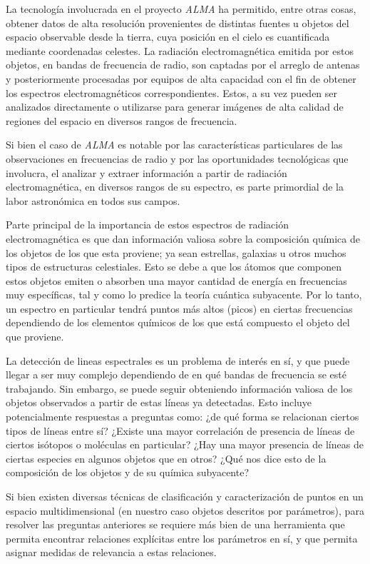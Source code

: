 \begin{intro}
La tecnología involucrada en el proyecto \textit{ALMA} ha permitido, entre otras cosas, obtener datos de alta resolución provenientes de distintas fuentes u objetos del espacio observable desde la tierra, cuya posición en el cielo es cuantificada mediante coordenadas celestes. La radiación electromagnética emitida por estos objetos, en bandas de frecuencia de radio, son captadas por el arreglo de antenas y posteriormente procesadas por equipos de alta capacidad con el fin de obtener los espectros electromagnéticos correspondientes. Estos, a su vez pueden ser analizados directamente o utilizarse para generar imágenes de alta calidad de regiones del espacio en diversos rangos de frecuencia.

Si bien el caso de \textit{ALMA} es notable por las características particulares de las observaciones en frecuencias de radio y por las oportunidades tecnológicas que involucra, el analizar y extraer información a partir de radiación electromagnética, en diversos rangos de su espectro, es parte primordial de la labor astronómica en todos sus campos.

Parte principal de la importancia de estos espectros de radiación electromagnética es que dan información valiosa sobre la composición química de los objetos de los que esta proviene; ya sean estrellas, galaxias u otros muchos tipos de estructuras celestiales. Esto se debe a que los átomos que componen estos objetos emiten o absorben una mayor cantidad de energía en frecuencias muy específicas, tal y como lo predice la teoría cuántica subyacente. Por lo tanto, un espectro en particular tendrá puntos más altos (picos) en ciertas frecuencias dependiendo de los elementos químicos de los que está compuesto el objeto del que proviene.

La detección de lineas espectrales es un problema de interés en sí, y que puede llegar a ser muy complejo dependiendo de en qué bandas de frecuencia se esté trabajando. Sin embargo, se puede seguir obteniendo información valiosa de los objetos observados a partir de estas líneas ya detectadas. Esto incluye potencialmente respuestas a preguntas como: ¿de qué forma se relacionan ciertos tipos de líneas entre sí? ¿Existe una mayor correlación de presencia de líneas de ciertos isótopos o moléculas en particular? ¿Hay una mayor presencia de líneas de ciertas especies en algunos objetos que en otros? ¿Qué nos dice esto de la composición de los objetos y de su química subyacente?

Si bien existen diversas técnicas de clasificación y caracterización de puntos en un espacio multidimensional (en nuestro caso objetos descritos por parámetros), para resolver las preguntas anteriores se requiere más bien de una herramienta que permita encontrar relaciones explícitas entre los parámetros en sí, y que permita asignar medidas de relevancia a estas relaciones.


\end{intro}
